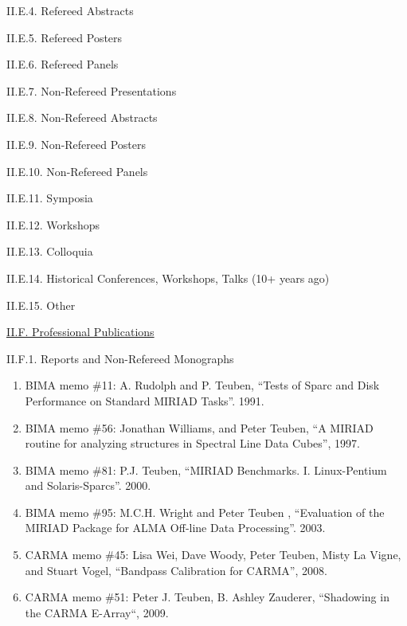 \documentclass[11pt,letterpaper]{article}
\begin{document}
II.E.4. Refereed Abstracts

II.E.5. Refereed Posters

II.E.6. Refereed Panels

II.E.7. Non-Refereed Presentations

II.E.8. Non-Refereed Abstracts


\begin{enumerate}[resume,label=\textbf{\arabic*}.]

  
\end{enumerate}

II.E.9. Non-Refereed Posters


II.E.10. Non-Refereed Panels

II.E.11. Symposia

II.E.12. Workshops

II.E.13. Colloquia

II.E.14. Historical Conferences, Workshops, Talks (10+ years ago)

II.E.15. Other


\underline{II.F. Professional Publications}

II.F.1. Reports and Non-Refereed Monographs


\begin{enumerate}[resume,label=\textbf{\arabic*}.]  
\item
BIMA memo \#11: A. Rudolph and P. Teuben,
``Tests of Sparc and Disk Performance on Standard MIRIAD Tasks''. 1991.

\item
BIMA memo \#56: Jonathan Williams, and Peter Teuben,
``A MIRIAD routine for analyzing structures in Spectral Line Data Cubes'', 1997.

\item
BIMA memo \#81: P.J. Teuben,
``MIRIAD Benchmarks. I. Linux-Pentium and Solaris-Sparcs''. 2000.

\item
BIMA memo \#95: M.C.H. Wright and Peter Teuben ,
``Evaluation of the MIRIAD Package for ALMA Off-line Data Processing''. 2003.

\item
CARMA memo \#45:  Lisa Wei, Dave Woody, Peter Teuben, Misty La Vigne, and Stuart Vogel,
``Bandpass Calibration for CARMA'', 2008.

\item
CARMA memo \#51: Peter J. Teuben, B. Ashley Zauderer,
``Shadowing in the CARMA E-Array``, 2009.
\end{enumerate}
               
\end{document}
